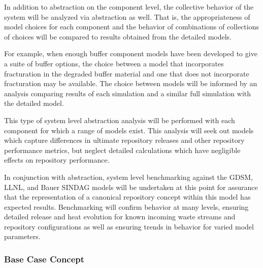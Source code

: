 
In addition to abstraction on the component level, the collective behavior of 
the system will be analyzed via abstraction as well. That is, the
appropriateness of model choices for each component and the behavior of 
combinations of collections of choices will be compared to results obtained from 
the detailed models. 


For example, when enough buffer component models have been developed to give a 
suite of buffer options, the choice between a model that incorporates
fracturation in the degraded buffer material and one that does not incorporate 
fracturation may be available.  The choice between models will be informed by an 
analysis comparing results of each simulation and a similar full simulation with  
the detailed model.


This type of system level abstraction analysis will be performed with each 
component for which a range of models exist. This analysis will seek out models 
which capture differences in ultimate repository releases and other repository 
performance metrics, but neglect detailed calculations which have negligible effects
on repository performance.


In conjunction with abstraction, system level benchmarking against the \gls{GDSM}, 
\gls{LLNL}, and Bauer \gls{SINDAG} models will be undertaken at this point for 
assurance that the representation of a canonical repository concept within this  
model has expected results. Benchmarking will confirm behavior at many levels, 
ensuring detailed release and heat evolution for known incoming waste streams
and repository configurations as well as ensuring trends in behavior for 
varied model parameters.

\subsubsection{Base Case Concept}




